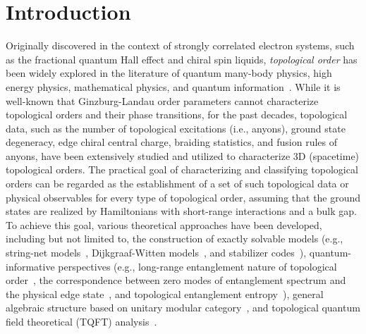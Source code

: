 \documentclass[11pt,nofootinbib,preprint]{revtex4-1}
\begin{document}
\section{Introduction\label{s1}}
Originally discovered in the context of strongly correlated electron systems, such as the fractional quantum Hall effect and chiral spin liquids, \textit{topological order} has been widely explored in the literature of quantum many-body physics, high energy physics, mathematical physics, and quantum information~\cite{wenZootopoRMP}. While it is well-known that Ginzburg-Landau order parameters cannot characterize topological orders and their phase transitions, for the past decades, topological data, such as the number of topological excitations (i.e., anyons), ground state degeneracy, edge chiral central charge, braiding statistics, and fusion rules of anyons, have been extensively studied and utilized to characterize  3D (spacetime) topological orders.  The practical goal of characterizing and classifying topological orders can be regarded as the establishment of a set of such topological data or physical observables for every type of topological order, assuming that the ground states are realized by Hamiltonians with short-range interactions and a bulk gap. To achieve this goal, various theoretical approaches have been developed, including but not limited to, the construction of exactly solvable models (e.g., string-net models~\cite{string1}, Dijkgraaf-Witten models~\cite{dwitten}, and stabilizer codes~\cite{Kitaev2003faulttolerant}), quantum-informative perspectives (e.g.,  long-range entanglement nature of topological order~\cite{CGW2010LRE},   the correspondence between zero modes of entanglement spectrum and the physical edge state~\cite{Li_Haldane}, and topological entanglement entropy~\cite{KitaevTopoEE,Levin_Wen_TEE}), general algebraic structure based on unitary modular category~\cite{Kitaev2006,string1,Kong2020}, and topological quantum  field theoretical (TQFT) analysis~\cite{Witten1989,Turaev2016}.  
\end{document}
